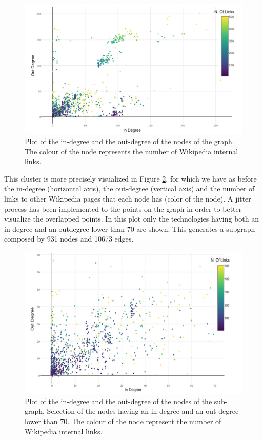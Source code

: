 \documentclass[]{book}
\theoremstyle{definition}
\theoremstyle{definition}
\theoremstyle{definition}
\theoremstyle{remark}
\begin{document}
\begin{figure}

{\centering \includegraphics[width=1\linewidth]{_bookdown_files/figures/techgraphplot1} 

}

\caption{Plot of the in-degree and the out-degree of the nodes of the graph. The colour of the node represents the number of Wikipedia internal links.}\label{fig:techgraphplot1}
\end{figure}

This cluster is more precisely visualized in Figure
\ref{fig:techgraphplot2}, for which we have as before the in-degree
(horizontal axis), the out-degree (vertical axis) and the number of
links to other Wikipedia pages that each node has (color of the node). A
jitter process has been implemented to the points on the graph in order
to better visualize the overlapped points. In this plot only the
technologies having both an in-degree and an outdegree lower than 70 are
shown. This generates a subgraph composed by 931 nodes and 10673 edges.

\begin{figure}

{\centering \includegraphics[width=1\linewidth]{_bookdown_files/figures/techgraphplot2} 

}

\caption{Plot of the in-degree and the out-degree of the nodes of the sub-graph. Selection of the nodes having an in-degree and an out-degree lower than 70. The colour of the node represent the number of Wikipedia internal links.}\label{fig:techgraphplot2}
\end{figure}
\end{document}
